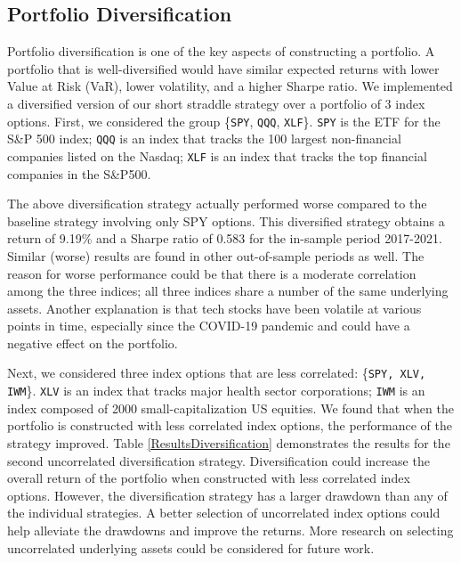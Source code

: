 \documentclass[10pt]{article}
\theoremstyle{definition}
\begin{document}
\subsection{Portfolio Diversification}
Portfolio diversification is one of the key aspects of constructing a portfolio. A portfolio that is well-diversified would have similar expected returns with lower Value at Risk (VaR), lower volatility, and a higher Sharpe ratio. We implemented a diversified version of our short straddle strategy over a portfolio of 3 index options. First, we considered the group \{\texttt{SPY}, \texttt{QQQ}, \texttt{XLF}\}. \texttt{SPY} is the ETF for the S\&P 500 index; \texttt{QQQ} is an index that tracks the 100 largest non-financial companies listed on the Nasdaq; \texttt{XLF} is an index that tracks the top financial companies in the S\&P500.

The above diversification strategy actually performed worse compared to the baseline strategy involving only SPY options. This diversified strategy obtains a return of 9.19\% and a Sharpe ratio of 0.583 for the in-sample period 2017-2021. Similar (worse) results are found in other out-of-sample periods as well. The reason for worse performance could be that there is a moderate correlation among the three indices; all three indices share a number of the same underlying assets. Another explanation is that tech stocks have been volatile at various points in time, especially since the COVID-19 pandemic and could have a negative effect on the portfolio.

Next, we considered three index options that are less correlated: \{\texttt{SPY, XLV, IWM}\}. \texttt{XLV} is an index that tracks major health sector corporations; \texttt{IWM} is an index composed of 2000 small-capitalization US equities. We found that when the portfolio is constructed with less correlated index options, the performance of the strategy improved. Table \ref{ResultsDiversification} demonstrates the results for the second uncorrelated diversification strategy. Diversification could increase the overall return of the portfolio when constructed with less correlated index options. However, the diversification strategy has a larger drawdown than any of the individual strategies. A better selection of uncorrelated index options could help alleviate the drawdowns and improve the returns. More research on selecting uncorrelated underlying assets could be considered for future work.  
\end{document}

